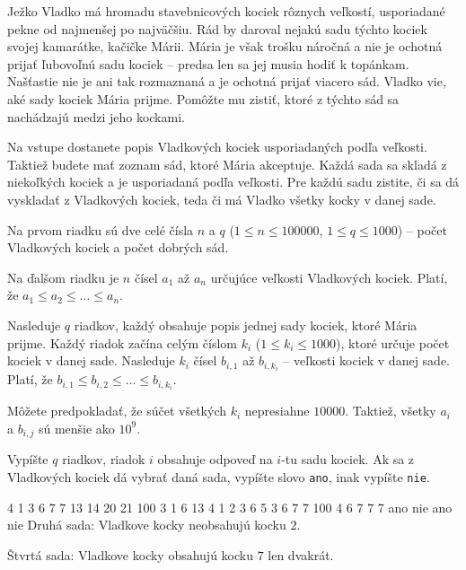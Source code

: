 




Ježko Vladko má hromadu stavebnicových kociek rôznych veľkostí, usporiadané pekne od najmenšej po
najväčšiu. Rád by daroval nejakú sadu týchto kociek svojej kamarátke, kačičke Márii. Mária je však
trošku náročná a nie je ochotná prijať ľubovoľnú sadu kociek -- predsa len sa jej musia hodiť k
topánkam. Našťastie nie je ani tak rozmaznaná a je ochotná prijať viacero sád. Vladko vie, aké
sady kociek Mária prijme. Pomôžte mu zistiť, ktoré z týchto sád sa nachádzajú medzi jeho kockami.


Na vstupe dostanete popis Vladkových kociek usporiadaných podľa veľkosti. Taktiež budete mať zoznam
sád, ktoré Mária akceptuje. Každá sada sa skladá z niekoľkých kociek a je usporiadaná podľa veľkosti.
Pre každú sadu zistite, či sa dá vyskladať z Vladkových kociek, teda či má Vladko všetky kocky v
danej sade.


Na prvom riadku sú dve celé čísla $n$ a $q$ ($1 \leq n \leq 100000$, $1 \leq q \leq 1000$) -- počet
Vladkových kociek a počet dobrých sád.

Na ďalšom riadku je $n$ čísel $a_1$ až $a_n$ určujúce veľkosti Vladkových kociek. Platí, že $a_1
\leq a_2 \leq \dots \leq a_n$.

Nasleduje $q$ riadkov, každý obsahuje popis jednej sady kociek, ktoré Mária prijme. Každý riadok
začína celým číslom $k_i$ ($1 \leq k_i \leq 1000$), ktoré určuje počet kociek v danej sade. Nasleduje $k_i$ čísel
$b_{i,1}$  až $b_{i, k_i}$ -- veľkosti kociek v danej sade. Platí, že $b_{i,1} \leq b_{i,2} \leq \dots
\leq b_{i,k_i}$.

Môžete predpokladať, že súčet všetkých $k_i$ nepresiahne $10000$. Taktiež, všetky $a_i$ a $b_{i,j}$
sú menšie ako $10^9$.


Vypíšte $q$ riadkov, riadok $i$ obsahuje odpoveď na $i$-tu sadu kociek. Ak sa z Vladkových kociek dá
vybrať daná sada, vypíšte slovo \texttt{ano}, inak vypíšte \texttt{nie}.


 4
1 3 6 7 7 13 14 20 21 100
3 1 6 13
4 1 2 3 6
5 3 6 7 7 100
4 6 7 7 7
\vystup
ano
nie
ano
nie
\komentar
Druhá sada: Vladkove kocky neobsahujú kocku $2$.

Štvrtá sada: Vladkove kocky obsahujú kocku $7$ len dvakrát.
\koniec


